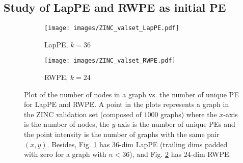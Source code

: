 \documentclass{article} \usepackage{iclr2021_conference,times}
\begin{document}
\subsection{Study of LapPE and RWPE as initial PE}
\label{sec:supplementary_unique_pe}





\begin{figure}[h]
\centering
  \begin{subfigure}{0.42\linewidth}
  \centering
    \texttt{[image: images/ZINC\_valset\_LapPE.pdf]}
    \vspace{-9pt}
    \caption{LapPE, $k=36$}
    \label{fig:uniqueness_LapPE}
  \end{subfigure}
  \hspace{7pt}
  \begin{subfigure}{0.42\linewidth}
  \centering
    \texttt{[image: images/ZINC\_valset\_RWPE.pdf]}
    \vspace{-9pt}
    \caption{RWPE, $k=24$}
    \label{fig:uniqueness_RWPE}
  \end{subfigure}
  \vspace{-5pt}
  \caption{Plot of the number of nodes in a graph vs. the number of unique PE for LapPE and RWPE. A point in the plots represents a graph in the ZINC validation set (composed of $1000$ graphs) where the $x$-axis is the number of nodes, the $y$-axis is the number of unique PEs and the point intensity is the number of graphs with the same pair $(x,y)$. Besides, Fig. \ref{fig:uniqueness_LapPE} has $36$-dim LapPE (trailing dims padded with zero for a graph with $n<36$), and Fig. \ref{fig:uniqueness_RWPE} has $24$-dim RWPE.}
  \label{fig:uniqueness_PE}
\end{figure}
\end{document}
